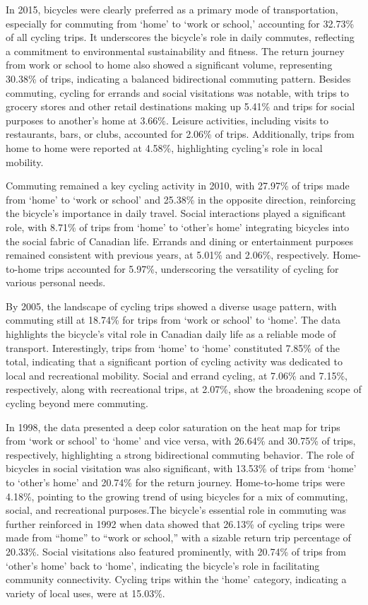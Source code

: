\documentclass[
11pt, %
oneside, %
english, %
singlespacing, %
]{macthesis} %
\begin{document}
In 2015, bicycles were clearly preferred as a primary mode of transportation, especially for commuting from `home' to `work or school,' accounting for 32.73\% of all cycling trips. It underscores the bicycle's role in daily commutes, reflecting a commitment to environmental sustainability and fitness. The return journey from work or school to home also showed a significant volume, representing 30.38\% of trips, indicating a balanced bidirectional commuting pattern. Besides commuting, cycling for errands and social visitations was notable, with trips to grocery stores and other retail destinations making up 5.41\% and trips for social purposes to another's home at 3.66\%. Leisure activities, including visits to restaurants, bars, or clubs, accounted for 2.06\% of trips. Additionally, trips from home to home were reported at 4.58\%, highlighting cycling's role in local mobility.

Commuting remained a key cycling activity in 2010, with 27.97\% of trips made from `home' to `work or school' and 25.38\% in the opposite direction, reinforcing the bicycle's importance in daily travel. Social interactions played a significant role, with 8.71\% of trips from `home' to `other's home' integrating bicycles into the social fabric of Canadian life. Errands and dining or entertainment purposes remained consistent with previous years, at 5.01\% and 2.06\%, respectively. Home-to-home trips accounted for 5.97\%, underscoring the versatility of cycling for various personal needs.

By 2005, the landscape of cycling trips showed a diverse usage pattern, with commuting still at 18.74\% for trips from `work or school' to `home'. The data highlights the bicycle's vital role in Canadian daily life as a reliable mode of transport. Interestingly, trips from `home' to `home' constituted 7.85\% of the total, indicating that a significant portion of cycling activity was dedicated to local and recreational mobility. Social and errand cycling, at 7.06\% and 7.15\%, respectively, along with recreational trips, at 2.07\%, show the broadening scope of cycling beyond mere commuting.

In 1998, the data presented a deep color saturation on the heat map for trips from `work or school' to `home' and vice versa, with 26.64\% and 30.75\% of trips, respectively, highlighting a strong bidirectional commuting behavior. The role of bicycles in social visitation was also significant, with 13.53\% of trips from `home' to `other's home' and 20.74\% for the return journey. Home-to-home trips were 4.18\%, pointing to the growing trend of using bicycles for a mix of commuting, social, and recreational purposes.The bicycle's essential role in commuting was further reinforced in 1992 when data showed that 26.13\% of cycling trips were made from ``home'' to ``work or school,'' with a sizable return trip percentage of 20.33\%. Social visitations also featured prominently, with 20.74\% of trips from `other's home' back to `home', indicating the bicycle's role in facilitating community connectivity. Cycling trips within the `home' category, indicating a variety of local uses, were at 15.03\%.
\end{document}
